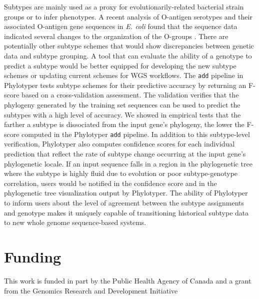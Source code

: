 \documentclass{bioinfo}
\begin{document}
Subtypes are mainly used as a proxy for evolutionarily-related bacterial strain groups or to infer phenotypes.
A recent analysis of O-antigen serotypes and their associated O-antigen gene sequences in \textit{E. coli} found that the sequence data indicated several changes to the organization of the O-groups \citep{DebRoy2016}.
There are potentially other subtype schemes that would show discrepancies between genetic data and subtype grouping.
A tool that can evaluate the ability of a genotype to predict a subtype would be better equipped for developing the new subtype schemes or updating current schemes for WGS workflows.
The \texttt{add} pipeline in Phylotyper tests subtype schemes for their predictive accuracy by returning an F-score based on a cross-validation assessment.
The validation verifies that the phylogeny generated by the training set sequences can be used to predict the subtypes with a high level of accuracy.
We showed in empirical tests that the farther a subtype is dissociated from the input gene's phylogeny, the lower the F-score computed in the Phylotyper \texttt{add} pipeline.
In addition to this subtype-level verification, Phylotyper also computes confidence scores for each individual prediction that reflect the rate of subtype change occurring at the input gene's phylogenetic locale.
If an input sequence falls in a region in the phylogenetic tree where the subtype is highly fluid due to evolution or poor subtype-genotype correlation, users would be notified in the confidence score and in the phylogenetic tree visualization output by Phylotyper. 
The ability of Phylotyper to inform users about the level of agreement between the subtype assignments and genotype makes it uniquely capable of transitioning historical subtype data to new whole genome sequence-based systems.\vspace*{-10pt}


\section*{Funding}

This work is funded in part by the Public Health Agency of Canada and a grant from the Genomics Research and Development Initiative\vspace*{-12pt}




\end{document}
